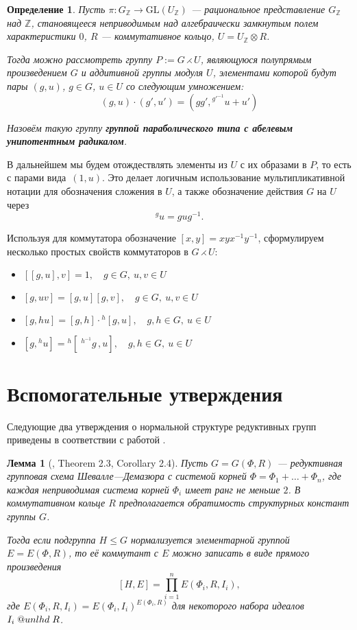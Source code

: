 \documentclass[12pt]{matmex-diploma}
\makeatletter
\newcommand{\slunlhd}{%
  \mathrel{\mathpalette\sl@unlhd\relax}%
}
\newcommand{\sl@unlhd}[2]{%
  \sbox\z@{$#1\lhd$}%
  \sbox\tw@{$#1\leqslant$}%
  \dimen@=\ht\tw@
  \advance\dimen@-\ht\z@
  \ifx#1\displaystyle
    \advance\dimen@ .2pt
  \else
    \ifx#1\textstyle
      \advance\dimen@ .2pt
    \fi
  \fi
  \ooalign{\raisebox{\dimen@}{$\m@th#1\lhd$}\cr$\m@th#1\leqslant$\cr}%
}
\theoremstyle{mystyleni}
\theoremstyle{mystyle}
\newtheorem{lm}{Лемма}
\newtheorem{definition}{Определение}
\newcommand{\Z}{\mathbb{Z}}
\renewcommand{\le}{\leqslant}
\renewcommand{\trianglelefteq}{\slunlhd}
\makeatother
\begin{document}
\begin{framed}
\begin{definition}
Пусть $\pi:G_\Z \to \mathrm{GL}(U_\Z)$ --- рациональное представление $G_\Z$ над $\Z$, становящееся неприводимым над алгебраически замкнутым полем характеристики $0$, $R$ --- коммутативное кольцо, $U=U_\Z\otimes R$.

Тогда можно рассмотреть группу $P:=G\rightthreetimes U$, являющуюся полупрямым произведением $G$ и аддитивной группы модуля $U$, элементами которой будут пары $(g,u)$, $g \in G$, $u \in U$ со следующим умножением:
$$
(g,u)\cdot (g',u') = (g g', {}^{g'^{-1}} u + u')
$$

Назовём такую группу \textit{\textbf{группой параболического типа с абелевым унипотентным радикалом}}.
\end{definition}
\end{framed}

В дальнейшем мы будем отождествлять элементы из $U$ с их образами в $P$, то есть с парами вида~$(1,u)$.
Это делает логичным использование мультипликативной нотации для обозначения сложения в $U$, а также обозначение действия $G$ на $U$ через $$^{g}u = g u g^{-1}.$$ 

Используя для коммутатора обозначение $[x,y]=x y x^{-1}y^{-1}$,
сформулируем несколько простых свойств коммутаторов в $G \rightthreetimes U$:

\begin{itemize}[label={\LARGE\raisebox{-0.5ex}{\textbullet}\quad},leftmargin=4\parindent]
\item
$[[g,u],v] = 1, \quad g \in G, \ u,v \in U $
\linespread{3}
\item 
$[g,uv] = [g,u][g,v], \quad g \in G, \ u,v \in U $
\item
$[g,hu] = [g,h]\cdot{}^h[g,u], \quad g,h \in G, \ u \in U $
\item
$[g,{}^{h}u] = {}^h[\;{}^{h^{-1}}g\,,u], \quad g,h \in G, \ u \in U $
\end{itemize}

\section{Вспомогательные утверждения}

Следующие два утверждения о нормальной структуре редуктивных групп приведены в соответствии с работой \citep{Stavrova2009}.

\begin{lm}[\citep{Stavrova2009}, Theorem 2.3, Corollary 2.4]
  \label{directproduct}
  Пусть $G = G(\Phi, R)$ --- редуктивная групповая схема Шевалле---Демазюра
  с системой корней $\Phi = \Phi_1 + \ldots + \Phi_n$, где каждая неприводимая система корней $\Phi_i$ имеет ранг не меньше $2$. В коммутативном кольце $R$ предполагается обратимость структурных констант группы $G$.
  
  Тогда если подгруппа $H \le G$ нормализуется элементарной группой $E = E(\Phi,R)$, то её коммутант с $E$ можно записать в виде прямого произведения
  $$ [H, E] = \prod_{i=1}^n E(\Phi_i,R,I_i), $$
  где $E(\Phi_i,R,I_i) = E(\Phi_i,I_i)^{E(\Phi_i,R)}$ для некоторого набора идеалов $I_i \trianglelefteq R$.
\end{lm}
\end{document}
